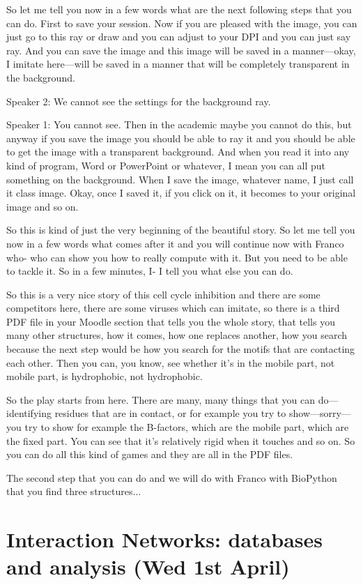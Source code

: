 So let me tell you now in a few words what are the next following steps that you can do. First to save your session. Now if you are pleased with the image, you can just go to this ray or draw and you can adjust to your DPI and you can just say ray. And you can save the image and this image will be saved in a manner—okay, I imitate here—will be saved in a manner that will be completely transparent in the background.

Speaker 2: We cannot see the settings for the background ray.

Speaker 1: You cannot see. Then in the academic maybe you cannot do this, but anyway if you save the image you should be able to ray it and you should be able to get the image with a transparent background. And when you read it into any kind of program, Word or PowerPoint or whatever, I mean you can all put something on the background. When I save the image, whatever name, I just call it class image. Okay, once I saved it, if you click on it, it becomes to your original image and so on.

So this is kind of just the very beginning of the beautiful story. So let me tell you now in a few words what comes after it and you will continue now with Franco who- who can show you how to really compute with it. But you need to be able to tackle it. So in a few minutes, I- I tell you what else you can do.

So this is a very nice story of this cell cycle inhibition and there are some competitors here, there are some viruses which can imitate, so there is a third PDF file in your Moodle section that tells you the whole story, that tells you many other structures, how it comes, how one replaces another, how you search because the next step would be how you search for the motifs that are contacting each other. Then you can, you know, see whether it's in the mobile part, not mobile part, is hydrophobic, not hydrophobic.

So the play starts from here. There are many, many things that you can do—identifying residues that are in contact, or for example you try to show—sorry—you try to show for example the B-factors, which are the mobile part, which are the fixed part. You can see that it's relatively rigid when it touches and so on. So you can do all this kind of games and they are all in the PDF files.

The second step that you can do and we will do with Franco with BioPython that you find three structures...


\section{Interaction Networks: databases and analysis (Wed 1st April)}



